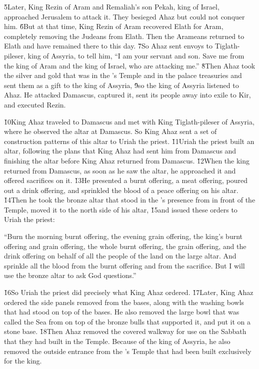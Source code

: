 \v{5}Later, King Rezin of Aram and Remaliah's son Pekah, king of Israel, approached Jerusalem to attack it. They besieged Ahaz but could not conquer him. \v{6}But at that time, King Rezin of Aram recovered Elath for Aram, completely removing the Judeans from Elath. Then the Arameans returned to Elath and have remained there to this day. \v{7}So Ahaz sent envoys to Tiglath-pileser, king of Assyria, to tell him, ``I am your servant and son. Save me from the king of Aram and the king of Israel, who are attacking me.'' \v{8}Then Ahaz took the silver and gold that was in the 's Temple and in the palace treasuries and sent them as a gift to the king of Assyria, \v{9}so the king of Assyria listened to Ahaz. He attacked Damascus, captured it, sent its people away into exile to Kir, and executed Rezin.

\v{10}King Ahaz traveled to Damascus and met with King Tiglath-pileser of Assyria, where he observed the altar at Damascus. So King Ahaz sent a set of construction patterns of this altar to Uriah the priest. \v{11}Uriah the priest built an altar, following the plans that King Ahaz had sent him from Damascus and finishing the altar before King Ahaz returned from Damascus. \v{12}When the king returned from Damascus, as soon as he saw the altar, he approached it and offered sacrifices on it. \v{13}He presented a burnt offering, a meat offering, poured out a drink offering, and sprinkled the blood of a peace offering on his altar. \v{14}Then he took the bronze altar that stood in the 's presence from in front of the Temple, moved it to the north side of his altar, \v{15}and issued these orders to Uriah the priest:

\begin{poetry}
\poeml ``Burn the morning burnt offering, the evening grain offering, the king's burnt offering and grain offering, the whole burnt offering, the grain offering, and the drink offering on behalf of all the people of the land on the large altar. And sprinkle all the blood from the burnt offering and from the sacrifice. But I will use the bronze altar to ask God questions.''
\end{poetry}

\v{16}So Uriah the priest did precisely what King Ahaz ordered. \v{17}Later, King Ahaz ordered the side panels removed from the bases, along with the washing bowls that had stood on top of the bases. He also removed the large bowl that was called the Sea from on top of the bronze bulls that supported it, and put it on a stone base. \v{18}Then Ahaz removed the covered walkway for use on the Sabbath that they had built in the Temple. Because of the king of Assyria, he also removed the outside entrance from the 's Temple that had been built exclusively for the king.

